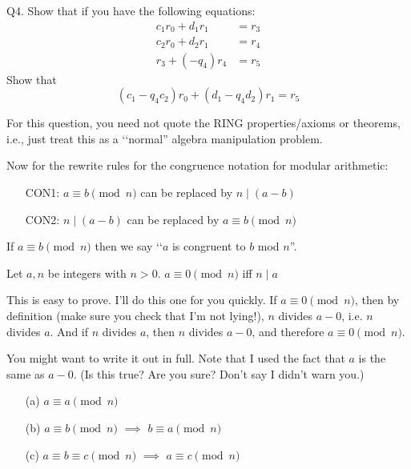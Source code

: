 \documentclass[a4paper,12pt]{article}
\begin{document}


\newpage

Q4. Show that if you have the following equations:
\begin{align*}
c_1 r_0 + d_1 r_1 &= r_3 \tag{1} \\
c_2 r_0 + d_2 r_1 &= r_4 \tag{2} \\
r_3 + (-q_4) r_4  &= r_5 \tag{3}
\end{align*}
Show that 
\[
(c_1 - q_4c_2) r_0 + (d_1 - q_4d_2)r_1 = r_5
\]

For this question, you need not quote the RING properties/axioms or
theorems, i.e., just treat this as a \lq\lq normal'' algebra 
manipulation problem.

\SOLUTION



\newpage
Now for the rewrite rules for the congruence notation for modular
arithmetic:

\begin{enumerate}[leftmargin=\LISTMARGIN]
\item[CON1:] $a \equiv b \pmod{n}$ can be replaced by $n \mid (a-b)$
\item[CON2:] $n \mid (a-b)$ can be replaced by $a \equiv b \pmod{n}$
\end{enumerate}

If $a \equiv b \pmod{n}$ then we say \lq\lq $a$ is congruent to
$b$ mod $n$''.

\newpage

\setcounter{thm}{13}

\begin{thm} Let $a,n$ be integers with $n > 0$.
$a \equiv 0 \pmod{n}$ iff $n \mid a$
\end{thm}

This is easy to prove.
I'll do this one for you quickly.
If $a \equiv 0 \pmod{n}$, then by definition
(make sure you check that I'm not lying!), 
$n$ divides $a - 0$, i.e. $n$ divides $a$.
And if $n$ divides $a$, then $n$ divides $a - 0$,
and therefore $a \equiv 0 \pmod{n}$.

You might want to write it out in full.
Note that I used the fact that $a$ is the same as $a - 0$.
(Is this true? Are you sure? Don't say I didn't warn you.)

\newpage

\begin{thm} \mbox{}
\begin{enumerate}[topsep=0in]
\item[(a)] $a \equiv a \pmod{n}$
\item[(b)] $a \equiv b \pmod{n}$ $\implies$ $b \equiv a \pmod{n}$
\item[(c)] $a \equiv b \equiv c \pmod{n}$ $\implies$ $a \equiv c \pmod{n}$
\end{enumerate}
\end{thm}
\end{document}
